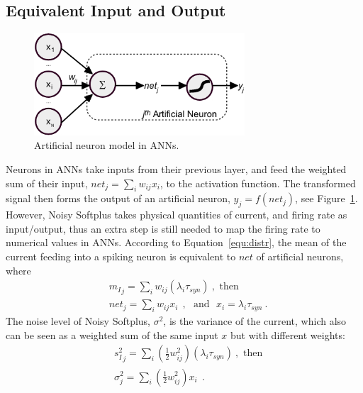 	\subsection{Equivalent Input and Output}
	
	\begin{figure}[bt]
		\centering
		\includegraphics[width=0.7\textwidth]{pics_iconip/neuron.pdf}
		\caption{Artificial neuron model in ANNs. }
		\label{Fig:neuron}
	\end{figure}
	Neurons in ANNs take inputs from their previous layer, and feed the weighted sum of their input, $net_j = \sum_i w_{ij}x_i$, to the activation function.
	The transformed signal then forms the output of an artificial neuron, $y_j=f(net_j)$, see Figure~\ref{Fig:neuron}.	
	However, Noisy Softplus takes physical quantities of current, and firing rate as input/output, thus an extra step is still needed to map the firing rate to numerical values in ANNs.
	According to Equation~\ref{equ:distr}, the mean of the current feeding into a spiking neuron is equivalent to $net$ of artificial neurons, where
	\begin{equation}
	\begin{aligned}
		& {m_I}_j = \sum_i w_{ij}(\lambda_{i}\tau_{syn})~, \textrm{  then}\\
		& net_j= \sum_i w_{ij} x_i~~, \textrm{~~and~~}
		x_i = \lambda_{i}\tau_{syn}~.
	\end{aligned}
	\label{equ:mi_input}
	\end{equation}
	The noise level of Noisy Softplus, $\sigma^2$, is the variance of the current, which also can be seen as a weighted sum of the same input $x$ but with different weights:
	\begin{equation}
	\begin{aligned}
		& {s_I^2}_j=\sum_i(\frac{1}{2} w_{ij}^2) (\lambda_{i}\tau_{syn})~, \textrm{  then}\\
		& \sigma^2_j= \sum_i (\frac{1}{2} w_{ij}^2) x_i~~.
	\end{aligned}
	\label{equ:si_input}
	\end{equation}
	

